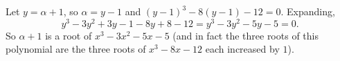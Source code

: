 Let $y=\alpha+1$, so $\alpha=y-1$ and $(y-1)^3-8(y-1)-12=0$. Expanding,
\[
y^3-3y^2+3y-1-8y+8-12=y^3-3y^2-5y-5=0 .
\]
So $\alpha+1$ is a root of $\boxed{x^3-3x^2-5x-5}$ (and in fact the three roots of this polynomial are the three roots of $x^3-8x-12$ each increased by $1$).

